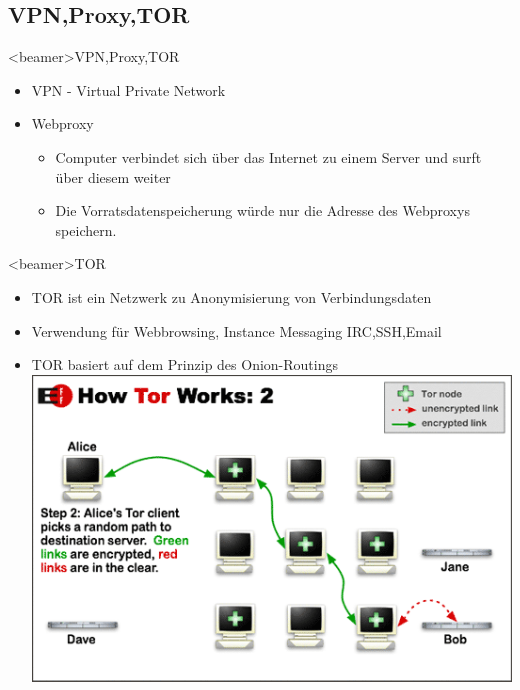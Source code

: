       \subsection{VPN,Proxy,TOR}
    \begin{frame}<beamer>{VPN,Proxy,TOR}
      \begin{itemize}
        \item VPN - Virtual Private Network 
        \item Webproxy
               \begin{itemize}
         \item Computer verbindet sich über das Internet zu einem Server und surft über diesem weiter
         \item Die Vorratsdatenspeicherung würde nur die Adresse des Webproxys speichern.
  
      \end{itemize}
      \end{itemize}
    \end{frame}
        \begin{frame}<beamer>{TOR}
      \begin{itemize}
        \item TOR ist ein Netzwerk zu Anonymisierung von Verbindungsdaten
        \item Verwendung für Webbrowsing, Instance Messaging IRC,SSH,Email
        \item TOR basiert auf dem Prinzip des Onion-Routings
        \includegraphics[height=0.7\textheight]{sections/img/tor_server_prinzip.png}
   
      \end{itemize}
    \end{frame}






